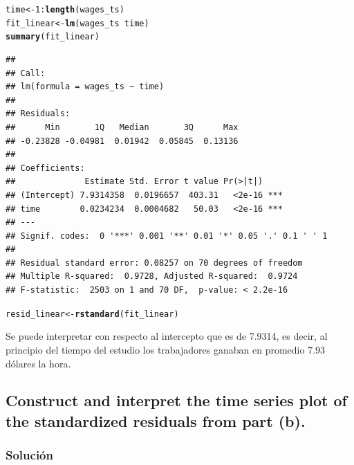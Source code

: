 \documentclass[12pt]{article}\usepackage[]{graphicx}\usepackage[]{xcolor}
\makeatletter
\newcommand{\hlnum}[1]{\textcolor[rgb]{0.686,0.059,0.569}{#1}}%
\newcommand{\hlopt}[1]{\textcolor[rgb]{0,0,0}{#1}}%
\newcommand{\hldef}[1]{\textcolor[rgb]{0.345,0.345,0.345}{#1}}%
\newcommand{\hlkwb}[1]{\textcolor[rgb]{0.69,0.353,0.396}{#1}}%
\newcommand{\hlkwd}[1]{\textcolor[rgb]{0.737,0.353,0.396}{\textbf{#1}}}%
\newenvironment{kframe}{%
 \def\at@end@of@kframe{}%
 \ifinner\ifhmode%
  \def\at@end@of@kframe{\end{minipage}}%
  \begin{minipage}{\columnwidth}%
 \fi\fi%
 \def\FrameCommand##1{\hskip\@totalleftmargin \hskip-\fboxsep
 \colorbox{shadecolor}{##1}\hskip-\fboxsep
     \hskip-\linewidth \hskip-\@totalleftmargin \hskip\columnwidth}%
 \MakeFramed {\advance\hsize-\width
   \@totalleftmargin\z@ \linewidth\hsize
   \@setminipage}}%
 {\par\unskip\endMakeFramed%
 \at@end@of@kframe}
\newenvironment{knitrout}{}{} %
\makeatother
\begin{document}
\begin{knitrout}
\color{fgcolor}\begin{kframe}
\begin{alltt}
\hldef{time} \hlkwb{<-} \hlnum{1}\hlopt{:}\hlkwd{length}\hldef{(wages_ts)}
\hldef{fit_linear} \hlkwb{<-} \hlkwd{lm}\hldef{(wages_ts} \hlopt{~} \hldef{time)}
\hlkwd{summary}\hldef{(fit_linear)}
\end{alltt}
\begin{verbatim}
## 
## Call:
## lm(formula = wages_ts ~ time)
## 
## Residuals:
##      Min       1Q   Median       3Q      Max 
## -0.23828 -0.04981  0.01942  0.05845  0.13136 
## 
## Coefficients:
##              Estimate Std. Error t value Pr(>|t|)    
## (Intercept) 7.9314358  0.0196657  403.31   <2e-16 ***
## time        0.0234234  0.0004682   50.03   <2e-16 ***
## ---
## Signif. codes:  0 '***' 0.001 '**' 0.01 '*' 0.05 '.' 0.1 ' ' 1
## 
## Residual standard error: 0.08257 on 70 degrees of freedom
## Multiple R-squared:  0.9728,	Adjusted R-squared:  0.9724 
## F-statistic:  2503 on 1 and 70 DF,  p-value: < 2.2e-16
\end{verbatim}
\end{kframe}
\end{knitrout}

\begin{knitrout}
\color{fgcolor}\begin{kframe}
\begin{alltt}
\hldef{resid_linear} \hlkwb{<-} \hlkwd{rstandard}\hldef{(fit_linear)}
\end{alltt}
\end{kframe}
\end{knitrout}

Se puede interpretar con respecto al intercepto que es de 7.9314, es decir, al principio del tiempo del estudio los trabajadores ganaban en promedio 7.93 dólares la hora.


\subsection{Construct and interpret the time series plot of the standardized residuals from
part (b).}

\subsubsection{Solución}
\end{document}
